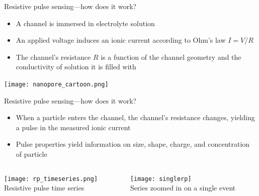 \begin{frame}[c]{Resistive pulse sensing---how does it work?}

	\begin{itemize}
		\item A channel is immersed in electrolyte solution
		\item An applied voltage induces an ionic current according to Ohm's law $I=V/R$
		\item The channel's resistance $R$ is a function of the channel geometry and the conductivity of solution it is filled with
	\end{itemize}


	{\centering 
		\texttt{[image: nanopore\_cartoon.png]} \\
		\par
	}

	
\end{frame}



\begin{frame}[c]{Resistive pulse sensing---how does it work?}

	\begin{itemize}
		\item When a particle enters the channel, the channel's resistance changes, yielding a pulse in the measured ionic current
		\item Pulse properties yield information on size, shape, charge, and concentration of particle
	\end{itemize}
	
	\begin{columns}[t]
	
		\begin{column}[T]{2.25in}
			{\centering
				\texttt{[image: rp\_timeseries.png]} \\
				Resistive pulse time series \\
				\par
			}
		\end{column}
		
		\begin{column}[T]{2.25in}
			{\centering
				\texttt{[image: singlerp]} \\
				Series zoomed in on a single event \\
				\par
			}
		\end{column}

	\end{columns}


	
\end{frame}


